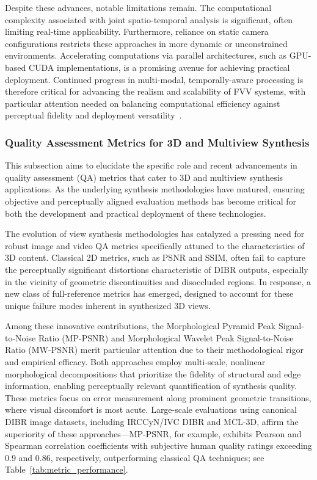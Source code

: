 \documentclass[sigconf]{acmart}
\begin{document}
Despite these advances, notable limitations remain. The computational complexity associated with joint spatio-temporal analysis is significant, often limiting real-time applicability. Furthermore, reliance on static camera configurations restricts these approaches in more dynamic or unconstrained environments. Accelerating computations via parallel architectures, such as GPU-based CUDA implementations, is a promising avenue for achieving practical deployment. Continued progress in multi-modal, temporally-aware processing is therefore critical for advancing the realism and scalability of FVV systems, with particular attention needed on balancing computational efficiency against perceptual fidelity and deployment versatility~\cite{refFVVRef98}.

\subsubsection{Quality Assessment Metrics for 3D and Multiview Synthesis}

This subsection aims to elucidate the specific role and recent advancements in quality assessment (QA) metrics that cater to 3D and multiview synthesis applications. As the underlying synthesis methodologies have matured, ensuring objective and perceptually aligned evaluation methods has become critical for both the development and practical deployment of these technologies.

The evolution of view synthesis methodologies has catalyzed a pressing need for robust image and video QA metrics specifically attuned to the characteristics of 3D content. Classical 2D metrics, such as PSNR and SSIM, often fail to capture the perceptually significant distortions characteristic of DIBR outputs, especially in the vicinity of geometric discontinuities and disoccluded regions. In response, a new class of full-reference metrics has emerged, designed to account for these unique failure modes inherent in synthesized 3D views.

Among these innovative contributions, the Morphological Pyramid Peak Signal-to-Noise Ratio (MP-PSNR) and Morphological Wavelet Peak Signal-to-Noise Ratio (MW-PSNR) merit particular attention due to their methodological rigor and empirical efficacy. Both approaches employ multi-scale, nonlinear morphological decompositions that prioritize the fidelity of structural and edge information, enabling perceptually relevant quantification of synthesis quality. These metrics focus on error measurement along prominent geometric transitions, where visual discomfort is most acute. Large-scale evaluations using canonical DIBR image datasets, including IRCCyN/IVC DIBR and MCL-3D, affirm the superiority of these approaches—MP-PSNR, for example, exhibits Pearson and Spearman correlation coefficients with subjective human quality ratings exceeding 0.9 and 0.86, respectively, outperforming classical QA techniques; see Table~\ref{tab:metric_performance}.
\end{document}
